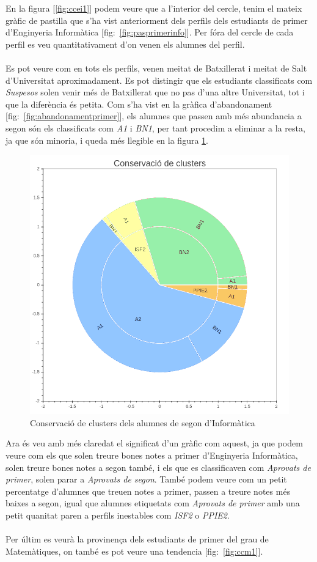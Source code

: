 \documentclass[12pt,a4paper,catalan]{article}
\begin{document}
En la figura [\ref{fig:ccei1}] podem veure que a l'interior del cercle, tenim el mateix gràfic de pastilla que s'ha vist anteriorment dels perfils dels estudiants de primer d'Enginyeria Informàtica [fig:~\ref{fig:pasprimerinfo}]. Per fóra del cercle de cada perfil es veu quantitativament d'on venen els alumnes del perfil. 
\\
\\
Es pot veure com en tots els perfils, venen meitat de Batxillerat i meitat de Salt d'Universitat aproximadament. Es pot distingir que els estudiants classificats com \textit{Suspesos} solen venir més de Batxillerat que no pas d'una altre Universitat, tot i que la diferència és petita. Com s'ha vist en la gràfica d'abandonament [fig:~\ref{fig:abandonamentprimer}], els alumnes que passen amb més abundancia a segon són els classificats com \textit{A1} i \textit{BN1}, per tant procedim a eliminar a la resta, ja que són minoria, i queda més llegible en la figura \ref{fig:ccei2}.

\begin{figure}[h]
\centering
\includegraphics[width=.6\linewidth]{img/conservacio_clusters_segon_info.png}
\caption{Conservació de clusters dels alumnes de segon d'Informàtica}
\label{fig:ccei2}
\end{figure}

Ara és veu amb més claredat el significat d'un gràfic com aquest, ja que podem veure com els que solen treure bones notes a primer d'Enginyeria Informàtica, solen treure bones notes a segon també, i els que es classificaven com \textit{Aprovats de primer}, solen parar a \textit{Aprovats de segon}. També podem veure com un petit percentatge d'alumnes que treuen notes a primer, passen a treure notes més baixes a segon, igual que alumnes etiquetats com \textit{Aprovats de primer} amb una petit quanitat paren a perfils inestables com \textit{ISF2} o \textit{PPIE2}.
\\
\\
Per últim es veurà la provinença dels estudiants de primer del grau de Matemàtiques, on també es pot veure una tendencia [fig:~\ref{fig:ccm1}].
\end{document}
